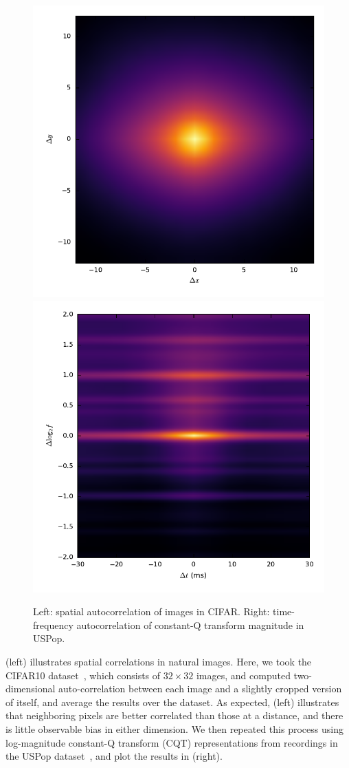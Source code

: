 \documentclass{article}
\def\eg{\emph{e.g.}}
\begin{document}
\begin{figure}
    \includegraphics[width=0.5\columnwidth]{figs/cifar-corr}%
    \includegraphics[width=0.5\columnwidth]{figs/uspop-corr}
    \caption{Left: spatial autocorrelation of images in CIFAR.\@
    Right: time-frequency autocorrelation of constant-Q transform magnitude in USPop.}
\label{fig:corr}
\end{figure}

 (left) illustrates spatial correlations in natural images.
Here, we took the CIFAR10 dataset~\cite{krizhevsky2009learning}, which consists of ${32\times 32}$ images, and computed two-dimensional auto-correlation between each image and a slightly cropped version of itself, and average the results over the dataset.
As expected,  (left) illustrates that neighboring pixels are better correlated than those at a distance, and there is little observable bias in either dimension.
We then repeated this process using log-magnitude constant-Q transform (CQT) representations  from recordings in the USPop dataset~\cite{berenzweig2004large}, and plot the results in  (right).
\end{document}
